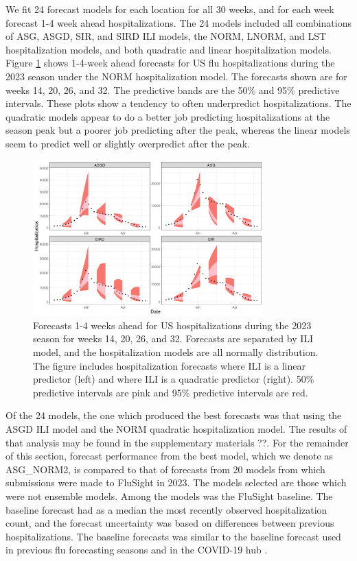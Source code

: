 We fit 24 forecast models for each location for all 30 weeks, and for each 
week forecast 1-4 week ahead hospitalizations. The 24 models included all 
combinations of ASG, ASGD, SIR, and SIRD ILI models, the NORM, LNORM, and LST 
hospitalization models, and both quadratic and linear hospitalization models.
Figure \ref{fig:normal_flu_forecasts} shows 1-4-week ahead forecasts for US 
flu hospitalizations during the 2023 season under the NORM hospitalization 
model. The forecasts shown are for weeks 14, 20, 26, and 32. The predictive 
bands are the 50\% and 95\% predictive intervals.
These plots show a tendency to often underpredict hospitalizations. The 
quadratic models appear to do a better job predicting  hospitalizations at 
the season peak but a poorer job predicting after the peak, whereas the linear 
models seem to predict well or slightly overpredict after the peak. 


\begin{figure}[hbt!]

  \centering
  \includegraphics[width=.49\linewidth, height=6cm]{Images/normal_sq_forecasts_us.png}
\caption{Forecasts 1-4 weeks ahead for US hospitalizations during the 2023 
season for weeks 14, 20, 26, and 32. Forecasts are separated by ILI model, 
and the hospitalization models are all normally distribution. The figure 
includes hospitalization forecasts where ILI is a linear predictor (left) 
and where ILI is a quadratic predictor (right). 50\% predictive intervals 
are pink and 95\% predictive intervals are red.}
\label{fig:normal_flu_forecasts}
\end{figure}



Of the 24 models, the one which produced the best forecasts was that using
the ASGD ILI model and the NORM quadratic hospitalization model. The results of
that analysis may be found in the supplementary materials ??. For the remainder 
of this section, forecast performance from the best model, which we denote
as ASG\_NORM2, is compared to that of forecasts from 20 models from which
submissions were made to FluSight in 2023. 
The models selected are those which were not ensemble models. Among the models
was the FluSight baseline. The baseline forecast had as a median the most 
recently observed 
hospitalization count, and the forecast uncertainty was based on 
differences between 
previous hospitalizations. The baseline forecasts was
similar to the baseline forecast used in
previous flu forecasting seasons and in the COVID-19 hub 
\cite[]{mathis2024evaluation, Cramer2022-hub-dataset}.

